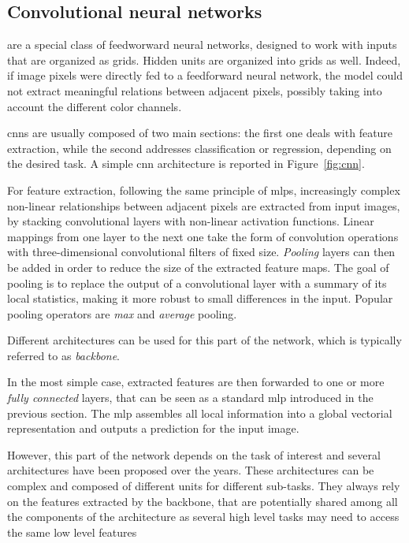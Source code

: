 \documentclass[%
    corpo=12pt,
    twoside,
    stile=classica,   
    tipotesi=magistrale,
    evenboxes,
    english,
	numerazioneromana,
]{toptesi}
\begin{document}
\subsection{Convolutional neural networks}
 are a special class of feedworward neural networks, designed to work with inputs that are organized as grids. Hidden units are organized into grids as well. Indeed, if image pixels were directly fed to a feedforward neural network, the model could not extract meaningful relations between adjacent pixels, possibly taking into account the different color channels.

\bigskip
\Glspl{cnn} are usually composed of two main sections: the first one deals with feature extraction, while the second addresses classification or regression, depending on the desired task. A simple \gls{cnn} architecture is reported in Figure~\ref{fig:cnn}.

\medskip
For feature extraction, following the same principle of \glspl{mlp}, increasingly complex non-linear relationships between adjacent pixels are extracted from input images, by stacking convolutional layers with non-linear activation functions. Linear mappings from one layer to the next one take the form of convolution operations with three-dimensional convolutional filters of fixed size. \textit{Pooling} layers can then be added in order to reduce the size of the extracted feature maps. The goal of pooling is to replace the output of a convolutional layer with a summary of its local statistics, making it more robust to small differences in the input. Popular pooling operators are \textit{max} and \textit{average} pooling.

Different architectures can be used for this part of the network, which is typically referred to as \textit{backbone}.

\medskip
In the most simple case, extracted features are then forwarded to one or more \textit{fully connected} layers, that can be seen as a standard \gls{mlp} introduced in the previous section. The \gls{mlp} assembles all local information into a global vectorial representation and outputs a prediction for the input image.

However, this part of the network depends on the task of interest and several architectures have been proposed over the years. These architectures can be complex and composed of different units for different sub-tasks. They always rely on the features extracted by the backbone, that are potentially shared among all the components of the architecture as several high level tasks may need to access the same low level features
\end{document}
